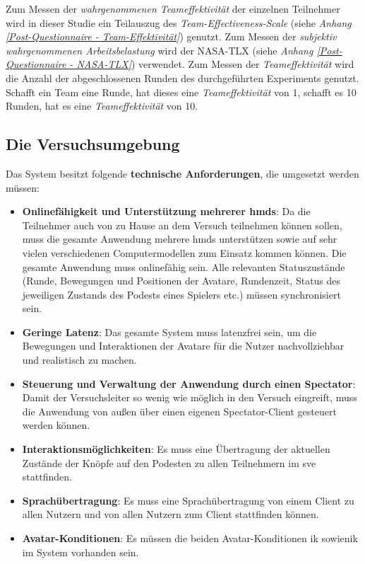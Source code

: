 \documentclass[a4paper,11pt]{article}%
\renewcommand{\\}{\vspace*{0.5\baselineskip} \newline}
\begin{document}
Zum Messen der \textit{wahrgenommenen Teameffektivität} der einzelnen Teilnehmer wird in dieser Studie ein Teilauszug des \textit{Team-Effectiveness-Scale} (siehe \textit{Anhang \ref{Post-Questionnaire - Team-Effektivität}}) \citep[S. 469]{gibson2003team} genutzt. Zum Messen der \textit{subjektiv wahrgenommenen Arbeitsbelastung} wird der NASA-TLX (siehe \textit{Anhang \ref{Post-Questionnaire - NASA-TLX}}) \citep{NASATLX} verwendet.
Zum Messen der \textit{Teameffektivität} wird die Anzahl der abgeschlossenen Runden des durchgeführten Experiments genutzt. Schafft ein Team eine Runde, hat dieses eine \textit{Teameffektivität} von 1, schafft es 10 Runden, hat es eine \textit{Teameffektivität} von 10.

\newpage
\subsection{Die Versuchsumgebung}
\label{TechnischeAnforderungen}
Das System besitzt folgende \textbf{technische Anforderungen}, die umgesetzt werden müssen:
\begin{itemize}
\item \textbf{Onlinefähigkeit und Unterstützung mehrerer \ac{hmd}s}: Da die Teilnehmer auch von zu Hause an dem Versuch teilnehmen können sollen, muss die gesamte Anwendung mehrere \ac{hmd}s unterstützen sowie auf sehr vielen verschiedenen Computermodellen zum Einsatz kommen können. Die gesamte Anwendung muss onlinefähig sein. Alle relevanten Statuszustände (Runde, Bewegungen und Positionen der Avatare, Rundenzeit, Status des jeweiligen Zustands des Podests eines Spielers etc.) müssen synchronisiert sein.
\item \textbf{Geringe Latenz}: Das gesamte System muss latenzfrei sein, um die Bewegungen und Interaktionen der Avatare für die Nutzer nachvollziehbar und realistisch zu machen.
\item \textbf{Steuerung und Verwaltung der Anwendung durch einen Spectator}: Damit der Versuchsleiter so wenig wie möglich in den Versuch eingreift, muss die Anwendung von außen über einen eigenen Spectator-Client gesteuert werden können.
\item \textbf{Interaktionsmöglichkeiten}: Es muss eine Übertragung der aktuellen Zustände der Knöpfe auf den Podesten zu allen Teilnehmern im \ac{sve} stattfinden.
\item \textbf{Sprachübertragung}: Es muss eine Sprachübertragung von einem Client zu allen Nutzern und von allen Nutzern zum Client stattfinden können.
\item \textbf{Avatar-Konditionen}: Es müssen die beiden Avatar-Konditionen \ac{ik} sowie\newline \ac{nik} im System vorhanden sein.
\end{itemize}
\end{document}
